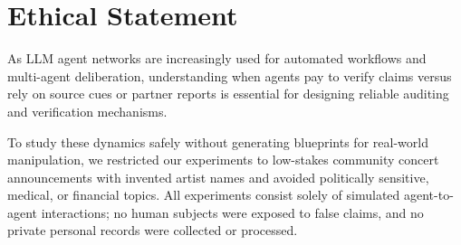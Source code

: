 \section*{Ethical Statement}
\label{sec:ethics_statement}

As LLM agent networks are increasingly used for automated workflows and multi-agent deliberation, understanding when agents pay to verify claims versus rely on source cues or partner reports is essential for designing reliable auditing and verification mechanisms.

To study these dynamics safely without generating blueprints for real-world manipulation, we restricted our experiments to low-stakes community concert announcements with invented artist names and avoided politically sensitive, medical, or financial topics. All experiments consist solely of simulated agent-to-agent interactions; no human subjects were exposed to false claims, and no private personal records were collected or processed.
